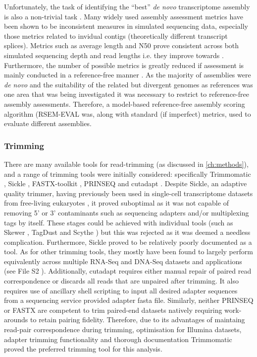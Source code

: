 Unfortunately, the task of identifying the ``best'' \textit{de novo} transcriptome assembly is also a non-trivial 
task \citep{Neil2013}.  Many widely used assembly assessment metrics have been shown to be
inconsistent measures in simulated sequencing data, especially those metrics related to invidual
contigs (theoretically different transcript splices).  Metrics such as average length and N50
prove consistent across both simulated sequencing depth and read lengths i.e. they improve 
towards \citep{Neil2013}.  Furthermore, the number of possible metrics is greatly reduced
if assessment is mainly conducted in a reference-free manner \citep{Li2014}.  As the majority of
assemblies were \textit{de novo} and the suitability of the related but divergent genomes
as references was one area that was being investigated it was necessary to restrict to reference-free
assembly assessments.  Therefore, a model-based reference-free assembly scoring algorithm (RSEM-EVAL \citep{Li2014} was,
    along with standard (if imperfect) metrics, used to evaluate different assemblies. 







\subsubsection{Trimming}

There are many available tools for read-trimming (as discussed in \ref{ch:methods}),
and a range of trimming tools were initially
considered: specifically Trimmomatic \citep{Bolger2014a}, Sickle \citep{JoshiGitHub}, FASTX-toolkit \citep{gordon2010fastx},
PRINSEQ \citep{Schmieder2011} and cutadapt \citep{martin2011cutadapt}. 
Despite Sickle, an adaptive quality trimmer, having previously been used in single-cell transcriptome datasets 
from free-living eukaryotes \citep{Kolisko2014}, it proved suboptimal as it was
not capable of removing 5' or 3' contaminants such as sequencing adapters and/or multiplexing tags by itself.  
These stages could be achieved with individual tools (such as Skewer \citep{Jiang2014}, 
TagDust \citep{Lassmann2009} and Scythe \citep{Buffalo}) but this was rejected as it was
deemed a needless complication.  Furthermore, Sickle proved to be relatively poorly documented
as a tool.   As for other trimming tools, they mostly have  
been found to largely perform equivalently across multiple RNA-Seq and DNA-Seq datasets and applications 
(see File S2 \citep{DelFabbro2013}).  Additionally, cutadapt requires either manual repair of 
paired read correspondence or discards all reads that are unpaired after trimming. It also requires
use of ancillary shell scripting to input all desired adapter sequences from a sequencing service
provided adapter fasta file.  Similarly, neither PRINSEQ or FASTX are competent to trim paired-end datasets 
natively requiring work-arounds to retain pairing fidelity.
Therefore, due to its advantages of maintaing read-pair correspondence during trimming, 
optimisation for Illumina datasets, adapter trimming functionality and thorough documentation
Trimmomatic \citep{Bolger2014a} proved the preferred trimming tool for this analysis.

